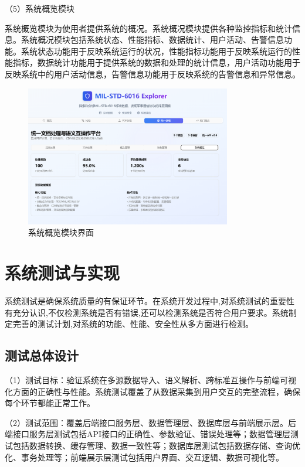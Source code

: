 （5）系统概览模块

系统概览模块为使用者提供系统的概况。系统概况模块提供各种监控指标和统计信息。系统概况模块包括系统状态、性能指标、数据统计、用户活动、告警信息功能。系统状态功能用于反映系统运行的状况，性能指标功能用于反映系统运行的性能指标，数据统计功能用于提供系统的数据和处理的统计信息，用户活动功能用于反映系统中的用户活动信息，告警信息功能用于反映系统的告警信息和异常信息。

\begin{figure}[H]
\centering
\includegraphics[width=0.8\textwidth]{chapters/fig-0/front_overview.png}
\caption{系统概览模块界面}
\label{fig:frontend-overview}
\end{figure}




\section{系统测试与实现}

系统测试是确保系统质量的有保证环节。在系统开发过程中,对系统测试的重要性有充分认识,不仅检测系统是否有错误,还可以检测系统是否符合用户要求。系统制定完善的测试计划,对系统的功能、性能、安全性从多方面进行检测。

\subsection{测试总体设计}

（1）测试目标：验证系统在多源数据导入、语义解析、跨标准互操作与前端可视化方面的正确性与性能。系统测试覆盖了从数据采集到用户交互的完整流程，确保每个环节都能正常工作。

（2）测试范围：覆盖后端接口服务层、数据管理层、数据库层与前端展示层。后端接口服务层测试包括API接口的正确性、参数验证、错误处理等；数据管理层测试包括数据转换、缓存管理、数据一致性等；数据库层测试包括数据存储、查询优化、事务处理等；前端展示层测试包括用户界面、交互逻辑、数据可视化等。

